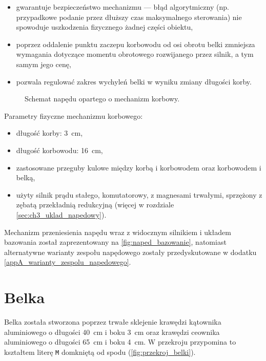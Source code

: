 \begin{itemize}
	\item gwarantuje bezpieczeństwo mechanizmu --- błąd algorytmiczny (np. przypadkowe podanie przez dłuższy czas maksymalnego sterowania) nie spowoduje uszkodzenia fizycznego żadnej części obiektu,
	\item poprzez oddalenie punktu zaczepu korbowodu od osi obrotu belki zmniejsza wymagania dotyczące momentu obrotowego rozwijanego przez silnik, a tym samym jego cenę,
	\item pozwala regulować zakres wychyleń belki w wyniku zmiany długości korby.
\end{itemize}

\begin{figure}[H]
	\centering
	
	\caption{Schemat napędu opartego o mechanizm korbowy.}
	\label{fig:mechanizm_korbowy}
\end{figure}

Parametry fizyczne mechanizmu korbowego:

\begin{itemize}
	\item długość korby: \SI{3}{cm},
	\item długość korbowodu: \SI{16}{cm},
	\item zastosowane przeguby kulowe między korbą i korbowodem oraz korbowodem i belką,
    \item użyty silnik prądu stałego, komutatorowy, z magnesami trwałymi, sprzężony z zębatą przekładnią redukcyjną (więcej w rozdziale \ref{sec:ch3_uklad_napedowy}).
\end{itemize}

Mechanizm przeniesienia napędu wraz z widocznym silnikiem i układem bazowania został zaprezentowany na \cref{fig:naped_bazowanie}, natomiast alternatywne warianty zespołu napędowego zostały przedyskutowane w dodatku \ref{appA_warianty_zespolu_napedowego}.



\section{Belka}
\label{sec:ch2_belka}

Belka została stworzona poprzez trwałe sklejenie krawędzi kątownika aluminiowego o długości \SI{40}{cm} i boku \SI{3}{cm} oraz krawędzi ceownika aluminiowego o długości \SI{65}{cm} i boku \SI{4}{cm}. W przekroju przypomina to kształtem literę \texttt{M} domkniętą od spodu (\cref{fig:przekroj_belki}).

